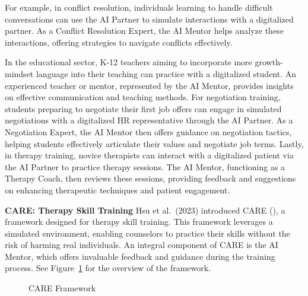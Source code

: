 \documentclass[
  letterpaper,
  numbers=noenddot,
  DIV=11,
  oneside]{scrreprt}
\theoremstyle{remark}
\begin{document}
For example, in conflict resolution, individuals learning to handle
difficult conversations can use the AI Partner to simulate interactions
with a digitalized partner. As a Conflict Resolution Expert, the AI
Mentor helps analyze these interactions, offering strategies to navigate
conflicts effectively.

In the educational sector, K-12 teachers aiming to incorporate more
growth-mindset language into their teaching can practice with a
digitalized student. An experienced teacher or mentor, represented by
the AI Mentor, provides insights on effective communication and teaching
methods. For negotiation training, students preparing to negotiate their
first job offers can engage in simulated negotiations with a digitalized
HR representative through the AI Partner. As a Negotiation Expert, the
AI Mentor then offers guidance on negotiation tactics, helping students
effectively articulate their values and negotiate job terms. Lastly, in
therapy training, novice therapists can interact with a digitalized
patient via the AI Partner to practice therapy sessions. The AI Mentor,
functioning as a Therapy Coach, then reviews these sessions, providing
feedback and suggestions on enhancing therapeutic techniques and patient
engagement.

\textbf{CARE: Therapy Skill Training} Hsu et al.~(2023) introduced CARE
(), a framework designed
for therapy skill training. This framework leverages a simulated
environment, enabling counselors to practice their skills without the
risk of harming real individuals. An integral component of CARE is the
AI Mentor, which offers invaluable feedback and guidance during the
training process. See Figure~\ref{fig-care} for the overview of the
framework.

\begin{figure}


\caption{\label{fig-care}CARE Framework}

\end{figure}%
\end{document}
